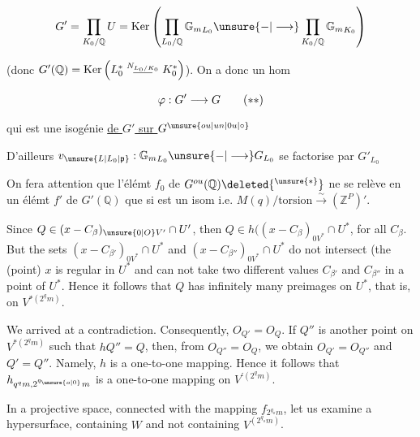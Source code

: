 \[
G'=\prod_{K_0/\mathbb Q}U=\operatorname{Ker}\left(\prod_{L_0/\mathbb Q}{\mathbb G_m}_{L_0}\unsure{-|\longrightarrow}\prod_{K_0/\mathbb Q}{\mathbb G_m}_{K_0}\right)
\]

(donc $G'(\mathbb Q)=\operatorname{Ker}\left(L_0^*\mathrel{\overset{N_{L_0/K_0}}{\rule{1.7em}{.4pt}}}K_0^*\right)$). On
a donc un hom

\[
\varphi:G'\longrightarrow G\tag*{(\ensuremath{**})}
\]

qui est une isogénie \uline{de $G'$ sur $G^{\unsure{ou|un|0u|\circ}}$}

D'ailleurs $v_{\unsure{L|L_0|\mathfrak p}}:{\mathbb G_m}_{L_0}\unsure{-|\longrightarrow}G_{L_0}$ se factorise
par $G'_{L_0}$


On fera attention que l'élémt $f_0$  de $G^{ou}(\mathbb Q)\deleted{{}^{\unsure{*}}}$
ne se relève en un élémt  $f'$ de $G'(\mathbb Q)$ que
si \inserted{$\varphi$} est un isom i.e. $M(q)/\mathrm{torsion}\xrightarrow{\sim}(\mathbb Z^P)'$.



Since $Q\in(x-C_\beta)_{\unsure{0|O}V'}\cap  U'$, then $Q\in h((x-C_\beta)_{0V^*}\cap  U^*$,
for all $C_\beta$. But the sets $(x-C_{\beta'})_{0V^*}\cap  U^*$ and
$(x-C_{\beta''})_{0V^*}\cap  U^*$ do not intersect (the (point) $x$ is regular
in $U^*$ and can not take two different values $C_{\beta'}$ and $C_{\beta''}$
in a point of $U^*$. Hence it follows that $Q$ has infinitely
many preimages on $U^*$, that is, on $V^{*(2^q m)}$.

We arrived at a contradiction. Consequently, $O_{Q'}=O_Q$.
If $Q''$ is another point on $V^{*(2^q m)}$ such that $hQ''=Q$,
then, from $O_{Q''}=O_Q$, we obtain $O_{Q'}=O_{Q''}$ and $Q'=Q''$.
Namely, $h$ is a one\deleted{\unsure{=}}-to-one mapping. Hence it follows that
$h_{q^q m,2^{q_{\unsure{o|0}}}m}$ is a one-to-one mapping on $V^{'(2^q m)}$.

In a projective space, connected with the mapping $f_{2^{q_o}m}$,
let us examine a hypersurface, containing $W$ and not
containing $V^{(2^{q_o}m)}$.

